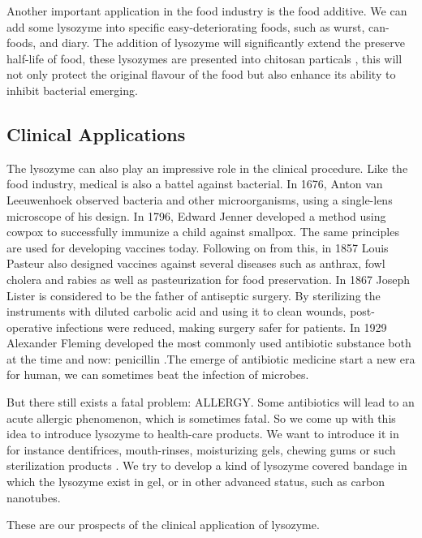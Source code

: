 Another important application in the food industry is the food additive. We can add some lysozyme into specific easy-deteriorating foods, such as wurst, can-foods, and diary. The addition of lysozyme will significantly extend the preserve half-life of food, these lysozymes are presented into chitosan particals \citep{Wu2017}, this will not only protect the original flavour of the food but also enhance its ability to inhibit bacterial emerging.

\subsection{Clinical Applications}
The lysozyme can also play an impressive role in the clinical procedure. Like the food industry, medical is also a battel against bacterial. In 1676, Anton van Leeuwenhoek observed bacteria and other microorganisms, using a single-lens microscope of his design.
In 1796, Edward Jenner developed a method using cowpox to successfully immunize a child against smallpox. The same principles are used for developing vaccines today.
Following on from this, in 1857 Louis Pasteur also designed vaccines against several diseases such as anthrax, fowl cholera and rabies as well as pasteurization for food preservation.
In 1867 Joseph Lister is considered to be the father of antiseptic surgery. By sterilizing the instruments with diluted carbolic acid and using it to clean wounds, post-operative infections were reduced, making surgery safer for patients.
In 1929 Alexander Fleming developed the most commonly used antibiotic substance both at the time and now: penicillin \citep{Brock2003}.The emerge of antibiotic medicine start a new era for human, we can sometimes beat the infection of microbes.

But there still exists a fatal problem: ALLERGY. Some antibiotics will lead to an acute allergic phenomenon, which is sometimes fatal. So we come up with this idea to introduce lysozyme to health-care products. We want to introduce it in for instance dentifrices, mouth-rinses, moisturizing gels, chewing gums or such sterilization products \citep{Tenovuo2002}.
We try to develop a kind of lysozyme covered bandage in which the lysozyme exist in gel, or in other advanced status, such as carbon nanotubes.

These are our prospects of the clinical application of lysozyme.



